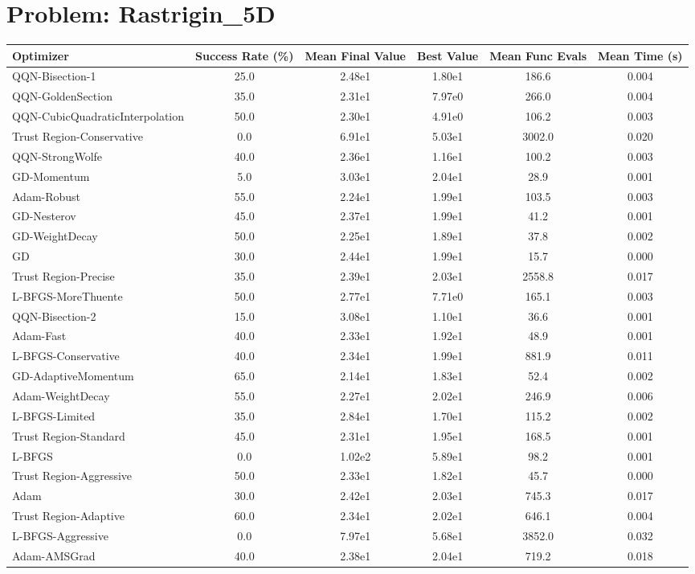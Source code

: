 \documentclass{article}
\begin{document}
\section{Problem: Rastrigin\_5D}
\begin{longtable}{p{3cm}*{5}{c}}
\toprule
\textbf{Optimizer} & \textbf{Success Rate (\%)} & \textbf{Mean Final Value} & \textbf{Best Value} & \textbf{Mean Func Evals} & \textbf{Mean Time (s)} \\
\midrule
QQN-Bisection-1 & 25.0 & 2.48e1 & 1.80e1 & 186.6 & 0.004 \\
QQN-GoldenSection & 35.0 & 2.31e1 & 7.97e0 & 266.0 & 0.004 \\
QQN-CubicQuadraticInterpolation & 50.0 & 2.30e1 & 4.91e0 & 106.2 & 0.003 \\
Trust Region-Conservative & 0.0 & 6.91e1 & 5.03e1 & 3002.0 & 0.020 \\
QQN-StrongWolfe & 40.0 & 2.36e1 & 1.16e1 & 100.2 & 0.003 \\
GD-Momentum & 5.0 & 3.03e1 & 2.04e1 & 28.9 & 0.001 \\
Adam-Robust & 55.0 & 2.24e1 & 1.99e1 & 103.5 & 0.003 \\
GD-Nesterov & 45.0 & 2.37e1 & 1.99e1 & 41.2 & 0.001 \\
GD-WeightDecay & 50.0 & 2.25e1 & 1.89e1 & 37.8 & 0.002 \\
GD & 30.0 & 2.44e1 & 1.99e1 & 15.7 & 0.000 \\
Trust Region-Precise & 35.0 & 2.39e1 & 2.03e1 & 2558.8 & 0.017 \\
L-BFGS-MoreThuente & 50.0 & 2.77e1 & 7.71e0 & 165.1 & 0.003 \\
QQN-Bisection-2 & 15.0 & 3.08e1 & 1.10e1 & 36.6 & 0.001 \\
Adam-Fast & 40.0 & 2.33e1 & 1.92e1 & 48.9 & 0.001 \\
L-BFGS-Conservative & 40.0 & 2.34e1 & 1.99e1 & 881.9 & 0.011 \\
GD-AdaptiveMomentum & 65.0 & 2.14e1 & 1.83e1 & 52.4 & 0.002 \\
Adam-WeightDecay & 55.0 & 2.27e1 & 2.02e1 & 246.9 & 0.006 \\
L-BFGS-Limited & 35.0 & 2.84e1 & 1.70e1 & 115.2 & 0.002 \\
Trust Region-Standard & 45.0 & 2.31e1 & 1.95e1 & 168.5 & 0.001 \\
L-BFGS & 0.0 & 1.02e2 & 5.89e1 & 98.2 & 0.001 \\
Trust Region-Aggressive & 50.0 & 2.33e1 & 1.82e1 & 45.7 & 0.000 \\
Adam & 30.0 & 2.42e1 & 2.03e1 & 745.3 & 0.017 \\
Trust Region-Adaptive & 60.0 & 2.34e1 & 2.02e1 & 646.1 & 0.004 \\
L-BFGS-Aggressive & 0.0 & 7.97e1 & 5.68e1 & 3852.0 & 0.032 \\
Adam-AMSGrad & 40.0 & 2.38e1 & 2.04e1 & 719.2 & 0.018 \\
\bottomrule
\end{longtable}
\end{document}
